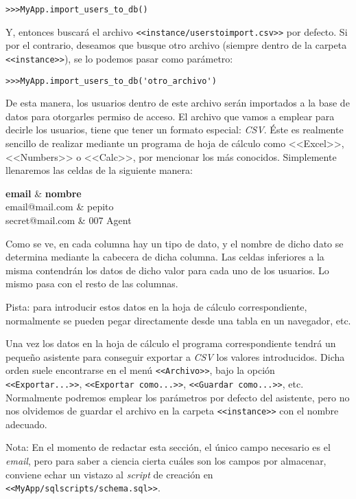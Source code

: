 \noindent\verb|>>>MyApp.import_users_to_db()|

Y, entonces buscará el archivo \texttt{<<instance\slash users\textunderscore to\textunderscore import.csv>>} por defecto. Si por el contrario, deseamos que busque otro archivo (siempre dentro de la carpeta \texttt{<<instance>>}), se lo podemos pasar como parámetro:

\noindent\verb|>>>MyApp.import_users_to_db('otro_archivo')|

De esta manera, los usuarios dentro de este archivo serán importados a la base de datos para otorgarles permiso de acceso. El archivo que vamos a emplear para decirle los usuarios, tiene que tener un formato especial: \textit{CSV}. Éste es realmente sencillo de realizar mediante un programa de hoja de cálculo como <<Excel>>, <<Numbers>> o <<Calc>>, por mencionar los más conocidos. Simplemente llenaremos las celdas de la siguiente manera:

{
	\textbf{email} & \textbf{nombre} \\
}
{
	email@mail.com & pepito \\
	secret@mail.com & 007 Agent \\
}

Como se ve, en cada columna hay un tipo de dato, y el nombre de dicho dato se determina mediante la cabecera de dicha columna. Las celdas inferiores a la misma contendrán los datos de dicho valor para cada uno de los usuarios. Lo mismo pasa con el resto de las columnas.

Pista: para introducir estos datos en la hoja de cálculo correspondiente, normalmente se pueden pegar directamente desde una tabla en un navegador, etc.

Una vez los datos en la hoja de cálculo el programa correspondiente tendrá un pequeño asistente para conseguir exportar a \textit{CSV} los valores introducidos. Dicha orden suele encontrarse en el menú \texttt{<<Archivo>>}, bajo la opción \texttt{<<Exportar...>>}, \texttt{<<Exportar como...>>}, \texttt{<<Guardar como...>>}, etc. Normalmente podremos emplear los parámetros por defecto del asistente, pero no nos olvidemos de guardar el archivo en la carpeta \texttt{<<instance>>} con el nombre adecuado.

Nota: En el momento de redactar esta sección, el único campo necesario es el \textit{email}, pero para saber a ciencia cierta cuáles son los campos por almacenar, conviene echar un vistazo al \textit{script} de creación en \texttt{<<MyApp/sql\textunderscore scripts\slash schema.sql>>}.

